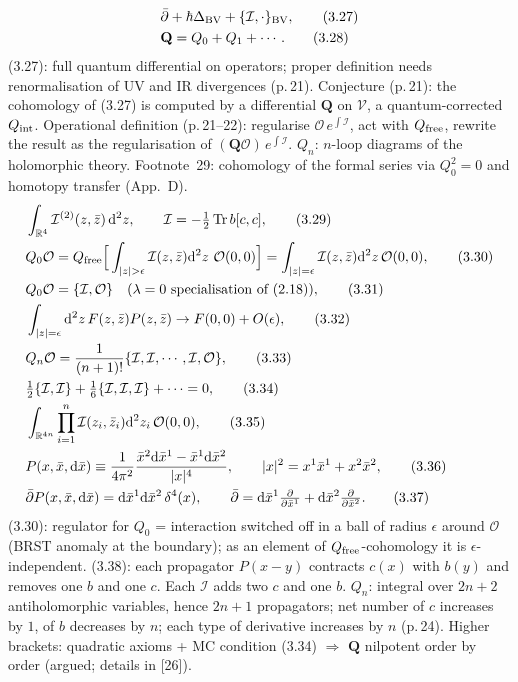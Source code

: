 \documentclass[11pt]{article}
\newcommand{\Tr}{\operatorname{Tr}}
\newcommand{\pb}{\bar{\partial}}
\newcommand{\cI}{\mathcal{I}}
\newcommand{\cO}{\mathcal{O}}
\newcommand{\bQ}{\mathbf{Q}}
\begin{document}
\begin{align}
&\pb+\hbar\Delta_{\rm BV}+\{\cI,\cdot\}_{\rm BV}, \tag{3.27}\\
&\bQ=Q_0+Q_1+\cdots. \tag{3.28}
\end{align}
(3.27): full quantum differential on operators; proper definition needs renormalisation of UV and IR divergences (p.\,21). Conjecture (p.\,21): the cohomology of (3.27) is computed by a differential $\bQ$ on $\mathcal V$, a quantum-corrected $Q_{\rm int}$. Operational definition (p.\,21--22): regularise $\cO\,e^{\int\cI}$, act with $Q_{\rm free}$, rewrite the result as the regularisation of $(\bQ\cO)\,e^{\int\cI}$. $Q_n$: $n$-loop diagrams of the holomorphic theory. Footnote~29: cohomology of the formal series via $Q_0^2=0$ and homotopy transfer (App.~D).
\begin{align}
&\int_{\mathbb R^4}\cI^{(2)}(z,\bar z)\,\mathrm d^2z,\qquad \cI=-\tfrac12\Tr b[c,c], \tag{3.29}\\
&Q_0\cO=Q_{\rm free}\Big[\int_{|z|>\epsilon}\cI(z,\bar z)\mathrm d^2z\ \cO(0,0)\Big]=\int_{|z|=\epsilon}\cI(z,\bar z)\mathrm d^2z\,\cO(0,0), \tag{3.30}\\
&Q_0\cO=\{\cI,\cO\}\quad(\lambda=0\text{ specialisation of (2.18)}), \tag{3.31}\\
&\int_{|z|=\epsilon}\mathrm d^2z\,F(z,\bar z)P(z,\bar z)\to F(0,0)+O(\epsilon), \tag{3.32}\\
&Q_n\cO=\frac1{(n+1)!}\{\cI,\cI,\cdots,\cI,\cO\}, \tag{3.33}\\
&\tfrac12\{\cI,\cI\}+\tfrac16\{\cI,\cI,\cI\}+\cdots=0, \tag{3.34}\\
&\int_{\mathbb R^{4n}}\prod_{i=1}^n\cI(z_i,\bar z_i)\mathrm d^2z_i\,\cO(0,0), \tag{3.35}\\
&P(x,\bar x,\mathrm d\bar x)\equiv\frac1{4\pi^2}\frac{\bar x^2\mathrm d\bar x^1-\bar x^1\mathrm d\bar x^2}{|x|^4},\qquad |x|^2=x^1\bar x^1+x^2\bar x^2, \tag{3.36}\\
&\pb P(x,\bar x,\mathrm d\bar x)=\mathrm d\bar x^1\mathrm d\bar x^2\,\delta^4(x),\qquad \pb=\mathrm d\bar x^1\tfrac{\partial}{\partial\bar x^1}+\mathrm d\bar x^2\tfrac{\partial}{\partial\bar x^2}. \tag{3.37}
\end{align}
(3.30): regulator for $Q_0$ = interaction switched off in a ball of radius $\epsilon$ around $\cO$ (BRST anomaly at the boundary); as an element of $Q_{\rm free}$-cohomology it is $\epsilon$-independent. (3.38): each propagator $P(x-y)$ contracts $c(x)$ with $b(y)$ and removes one $b$ and one $c$. Each $\cI$ adds two $c$ and one $b$. $Q_n$: integral over $2n+2$ antiholomorphic variables, hence $2n+1$ propagators; net number of $c$ increases by $1$, of $b$ decreases by $n$; each type of derivative increases by $n$ (p.\,24). Higher brackets: quadratic axioms + MC condition (3.34) $\Rightarrow$ $\bQ$ nilpotent order by order (argued; details in [26]).
\end{document}
